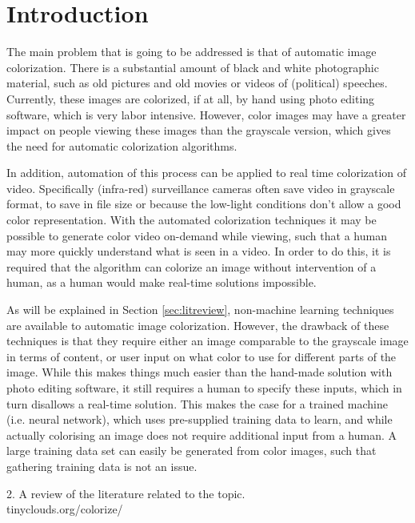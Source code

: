 \section{Introduction}
The main problem that is going to be addressed is that of automatic image colorization. There is a substantial amount of black and white photographic material, such as old pictures and old movies or videos of (political) speeches. Currently, these images are colorized, if at all, by hand using photo editing software, which is very labor intensive. However, color images may have a greater impact on people viewing these images than the grayscale version, which gives the need for automatic colorization algorithms.

In addition, automation of this process can be applied to real time colorization of video. Specifically (infra-red) surveillance cameras often save video in grayscale format, to save in file size or because the low-light conditions don't allow a good color representation. With the automated colorization techniques it may be possible to generate color video on-demand while viewing, such that a human may more quickly understand what is seen in a video. In order to do this, it is required that the algorithm can colorize an image without intervention of a human, as a human would make real-time solutions impossible.

As will be explained in Section \ref{sec:litreview}, non-machine learning techniques are available to automatic image colorization. However, the drawback of these techniques is that they require either an image comparable to the grayscale image in terms of content, or user input on what color to use for different parts of the image. While this makes things much easier than the hand-made solution with photo editing software, it still requires a human to specify these inputs, which in turn disallows a real-time solution. This makes the case for a trained machine (i.e. neural network), which uses pre-supplied training data to learn, and while actually colorising an image does not require additional input from a human. A large training data set can easily be generated from color images, such that gathering training data is not an issue.

2. A review of the literature related to the topic.\\
tinyclouds.org/colorize/\\



